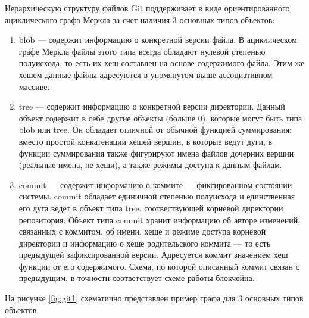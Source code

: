 Иерархическую структуру файлов Git поддерживает в виде ориентированного ациклического графа Меркла за счет наличия 3 основных типов объектов:
\begin{enumerate}
	\item blob --- содержит информацию о конкретной версии файла. В ациклическом графе Меркла файлы этого типа всегда обладают нулевой степенью полуисхода, то есть их хеш составлен на основе содержимого файла. Этим же хешем данные файлы адресуются в упомянутом выше ассоциативном массиве.
	\item tree --- содержит информацию о конкретной версии директории. Данный объект содержит в себе другие объекты (больше 0), которые могут быть типа blob или tree. Он обладает отличной от обычной функцией суммирования: вместо простой конкатенации хешей вершин, в которые ведут дуги, в функции суммирования также фигурируют имена файлов дочерних вершин (реальные имена, не хеши), а также режимы доступа к данным файлам.
	\item commit --- содержит информацию о коммите --- фиксированном состоянии системы. commit обладает единичной степенью полуисхода и единственная его дуга ведет в объект типа tree, соотвествующей корневой директории репозитория. Объект типа commit хранит информацию об авторе изменений, связанных с коммитом, об имени, хеше и режиме доступа корневой директории и информацию о хеше родительского коммита --- то есть предыдущей зафиксированной версии. Адресуется коммит значением хеш функции от его содержимого. Схема, по которой описанный коммит связан с предыдущим, в точности соответствует схеме работы блокчейна.
\end{enumerate}

На рисунке \ref{fig:git1} схематично представлен пример графа для 3 основных типов объектов.

